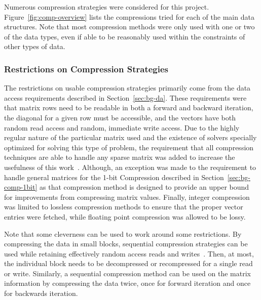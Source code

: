 Numerous compression strategies were considered for this project.
Figure~\ref{fig:comp-overview} lists the compressions tried for each of the main data structures.
Note that most compression methods were only used with one or two of the data types, even if able to be reasonably used within the constraints of other types of data.



\subsubsection{Restrictions on Compression Strategies}
The restrictions on usable compression strategies primarily come from the data access requirements described in Section~\ref{sec:bg-da}.
These requirements were that matrix rows need to be readable in both a forward and backward iteration, the diagonal for a given row must be accessible, and the vectors have both random read access and random, immediate write access.
Due to the highly regular nature of the particular matrix used and the existence of solvers specially optimized for solving this type of problem, the requirement that all compression techniques are able to handle any sparse matrix was added to increase the usefulness of this work~\cite{Saad:2003:IterativeMethods}.
Although, an exception was made to the requirement to handle general matrices for the 1-bit Compression described in Section~\ref{sec:bg-comp-1bit} as that compression method is designed to provide an upper bound for improvements from compressing matrix values.
Finally, integer compression was limited to lossless compression methods to ensure that the proper vector entries were fetched, while floating point compression was allowed to be lossy.

Note that some cleverness can be used to work around some restrictions.
By compressing the data in small blocks, sequential compression strategies can be used while retaining effectively random access reads and writes~\cite{Lindstrom:2014:zfp}.
Then, at most, the individual block needs to be decompressed or recompressed for a single read or write.
Similarly, a sequential compression method can be used on the matrix information by compressing the data twice, once for forward iteration and once for backwards iteration.


